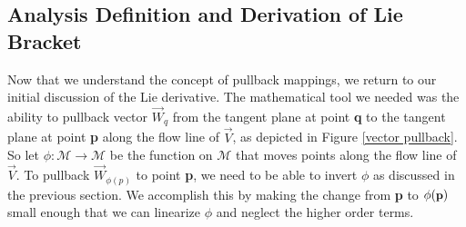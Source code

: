 \documentclass[10pt]{article}
\begin{document}
     \subsection{Analysis Definition and Derivation of Lie Bracket}
Now that we understand the concept of pullback mappings, we return to our initial discussion of the Lie derivative. The mathematical tool we needed was the ability to pullback vector $\vec W_q$ from the tangent plane at point \textbf{{\small q}} to the tangent plane at point \textbf{{\small p}} along the flow line of $\vec V$, as depicted in Figure \ref{vector pullback}. So let $\phi : \mathcal{M} \longrightarrow \mathcal{M}$ be the function on $\mathcal{M}$ that moves points along the flow line of $\vec V$. To pullback $\vec W_{\phi(p)}$ to point \textbf{{\small p}}, we need to be able to invert $\phi$ as discussed in the previous section. We accomplish this by making the change from \textbf{{\small p}} to $\phi(\textbf{{\small p}})$ small enough that we can linearize $\phi$ and neglect the higher order terms.
\end{document}
